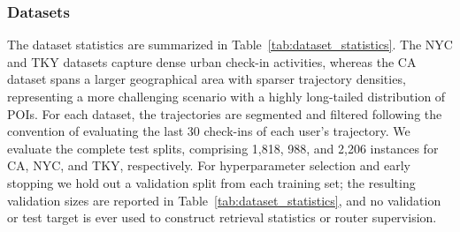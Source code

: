 \documentclass[journal]{IEEEtran}
\begin{document}
\subsubsection{Datasets}
The dataset statistics are summarized in Table~\ref{tab:dataset_statistics}. The NYC and TKY datasets capture dense urban check-in activities, whereas the CA dataset spans a larger geographical area with sparser trajectory densities, representing a more challenging scenario with a highly long-tailed distribution of POIs. For each dataset, the trajectories are segmented and filtered following the convention of evaluating the last 30 check-ins of each user's trajectory. We evaluate the complete test splits, comprising 1,818, 988, and 2,206 instances for CA, NYC, and TKY, respectively. For hyperparameter selection and early stopping we hold out a validation split from each training set; the resulting validation sizes are reported in Table~\ref{tab:dataset_statistics}, and no validation or test target is ever used to construct retrieval statistics or router supervision.
\end{document}
